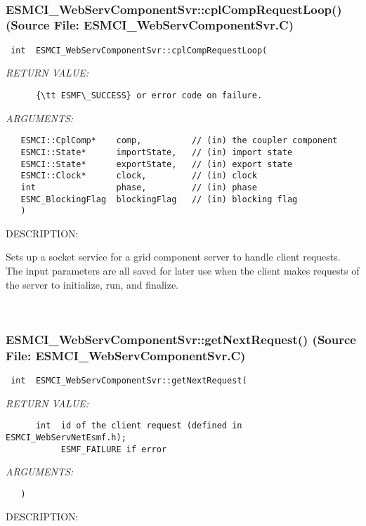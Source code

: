 \mbox{}\hrulefill\
 
\subsubsection{ESMCI\_WebServComponentSvr::cplCompRequestLoop() (Source File: ESMCI\_WebServComponentSvr.C)}


  
\begin{verbatim} int  ESMCI_WebServComponentSvr::cplCompRequestLoop(\end{verbatim}{\em RETURN VALUE:}
\begin{verbatim}      {\tt ESMF\_SUCCESS} or error code on failure.\end{verbatim}{\em ARGUMENTS:}
\begin{verbatim}   ESMCI::CplComp*    comp,          // (in) the coupler component
   ESMCI::State*      importState,   // (in) import state
   ESMCI::State*      exportState,   // (in) export state
   ESMCI::Clock*      clock,         // (in) clock
   int                phase,         // (in) phase
   ESMC_BlockingFlag  blockingFlag   // (in) blocking flag
   )\end{verbatim}
{\sf DESCRIPTION:\\ }


      Sets up a socket service for a grid component server to handle client
      requests.  The input parameters are all saved for later use when the
      client makes requests of the server to initialize, run, and finalize.
   
 
\mbox{}\hrulefill\
 
\subsubsection{ESMCI\_WebServComponentSvr::getNextRequest() (Source File: ESMCI\_WebServComponentSvr.C)}


  
\begin{verbatim} int  ESMCI_WebServComponentSvr::getNextRequest(\end{verbatim}{\em RETURN VALUE:}
\begin{verbatim}      int  id of the client request (defined in ESMCI_WebServNetEsmf.h);
           ESMF_FAILURE if error\end{verbatim}{\em ARGUMENTS:}
\begin{verbatim}   )\end{verbatim}
{\sf DESCRIPTION:\\ }


